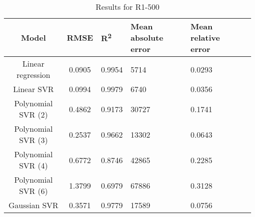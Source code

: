\begin{table}[H]
\centering
\begin{adjustbox}{center}
\begin{tabular}{c | c M{1.2cm} M{2.5cm} M{2.5cm} M{1.8cm}}
Model & RMSE & R\textsuperscript{2} & Mean absolute error & Mean relative error \tabularnewline
\hline
Linear regression & 0.0905 & 0.9954 &   5714 & 0.0293 \\
Linear SVR & 0.0994 & 0.9979 &   6740 & 0.0356 \\
Polynomial SVR (2) & 0.4862 & 0.9173 &  30727 & 0.1741 \\
Polynomial SVR (3) & 0.2537 & 0.9662 &  13302 & 0.0643 \\
Polynomial SVR (4) & 0.6772 & 0.8746 &  42865 & 0.2285 \\
Polynomial SVR (6) & 1.3799 & 0.6979 &  67886 & 0.3128 \\
Gaussian SVR & 0.3571 & 0.9779 &  17589 & 0.0756 \\
\end{tabular}
\end{adjustbox}
\\
\caption{Results for R1-500}
\label{tab:coreonly_linear_R1_500}
\end{table}
